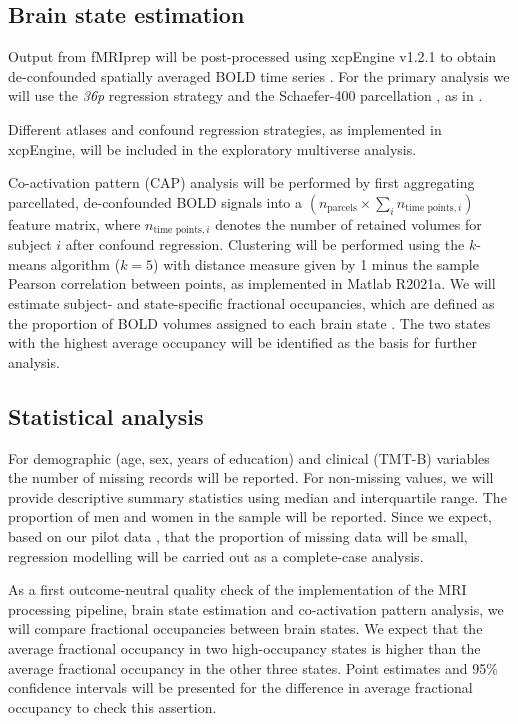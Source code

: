 \subsection{Brain state estimation}
Output from fMRIprep will be post-processed using xcpEngine v1.2.1 to obtain de-confounded spatially averaged BOLD time series \citep{Ciric2017-cl}.
For the primary analysis we will use the \textit{36p} regression strategy and the Schaefer-\num{400} parcellation \citep{Schaefer2018-bo}, as in \citep{Schlemm2022-he}.
 
Different atlases and confound regression strategies, as implemented in xcpEngine, will be included in the exploratory multiverse analysis.

Co-activation pattern (CAP) analysis will be performed by first aggregating parcellated, de-confounded BOLD signals into a $\left(n_{\text{parcels}}\times \sum_i{n_{\text{time points}, i}}\right)$ feature matrix, where $n_{\text{time points}, i}$ denotes the number of retained volumes for subject $i$ after confound regression.
Clustering will be performed using the $k$-means algorithm ($k=5$) with distance measure given by 1 minus the sample Pearson correlation between points, as implemented in Matlab R2021a.
We will estimate subject- and state-specific fractional occupancies, which are defined as the proportion of BOLD volumes assigned to each brain state \citep{Vidaurre2018-pb}. 
The two states with the highest average occupancy will be identified as the basis for further analysis.


\subsection{Statistical analysis}
For demographic (age, sex, years of education) and clinical (TMT-B) variables the number of missing records will be reported.
For non-missing values, we will provide descriptive summary statistics using median and interquartile range.
The proportion of men and women in the sample will be reported. Since we expect, based on our pilot data \citep{Schlemm2022-he}, that the proportion of missing data will be small, regression modelling will be carried out as a complete-case analysis.

As a first outcome-neutral quality check of the implementation of the MRI processing pipeline, brain state estimation and co-activation pattern analysis, we will compare fractional occupancies between brain states.
We expect that the average fractional occupancy in two high-occupancy states is higher than the average fractional occupancy in the other three states.
Point estimates and 95\% confidence intervals will be presented for the difference in average fractional occupancy to check this assertion.


